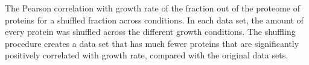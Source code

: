 \label{fig:shuffledcorr}
The Pearson correlation with growth rate of the fraction out of the proteome of proteins for a shuffled fraction across conditions.
In each data set, the amount of every protein was shuffled across the different growth conditions.
The shuffling procedure creates a data set that has much fewer proteins that are significantly positively correlated with growth rate, compared with the original data sets.